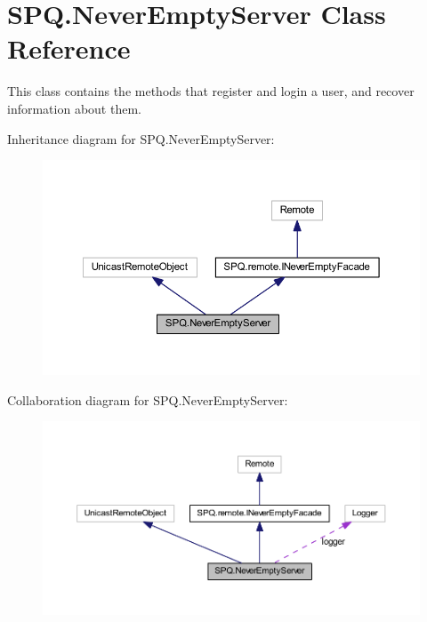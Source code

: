 \hypertarget{class_s_p_q_1_1_never_empty_server}{}\section{S\+P\+Q.\+Never\+Empty\+Server Class Reference}
\label{class_s_p_q_1_1_never_empty_server}


This class contains the methods that register and login a user, and recover information about them.  




Inheritance diagram for S\+P\+Q.\+Never\+Empty\+Server\+:\nopagebreak
\begin{figure}[H]
\begin{center}
\leavevmode
\includegraphics[width=350pt]{class_s_p_q_1_1_never_empty_server__inherit__graph}
\end{center}
\end{figure}


Collaboration diagram for S\+P\+Q.\+Never\+Empty\+Server\+:\nopagebreak
\begin{figure}[H]
\begin{center}
\leavevmode
\includegraphics[width=350pt]{class_s_p_q_1_1_never_empty_server__coll__graph}
\end{center}
\end{figure}
